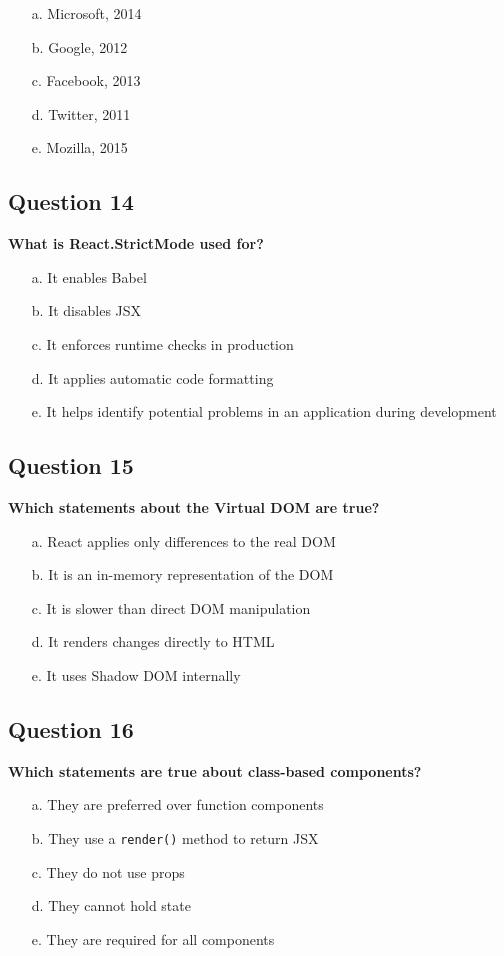 \documentclass{article}
\begin{document}
\begin{itemize}
  \item[a.] Microsoft, 2014
  \item[b.] Google, 2012
  \item[c.] Facebook, 2013
  \item[d.] Twitter, 2011
  \item[e.] Mozilla, 2015
\end{itemize}

\subsection*{Question 14}
\textbf{What is React.StrictMode used for?}

\begin{itemize}
  \item[a.] It enables Babel
  \item[b.] It disables JSX
  \item[c.] It enforces runtime checks in production
  \item[d.] It applies automatic code formatting
  \item[e.] It helps identify potential problems in an application during development
\end{itemize}

\subsection*{Question 15}
\textbf{Which statements about the Virtual DOM are true?}

\begin{itemize}
  \item[a.] React applies only differences to the real DOM
  \item[b.] It is an in-memory representation of the DOM
  \item[c.] It is slower than direct DOM manipulation
  \item[d.] It renders changes directly to HTML
  \item[e.] It uses Shadow DOM internally
\end{itemize}

\subsection*{Question 16}
\textbf{Which statements are true about class-based components?}

\begin{itemize}
  \item[a.] They are preferred over function components
  \item[b.] They use a \texttt{render()} method to return JSX
  \item[c.] They do not use props
  \item[d.] They cannot hold state
  \item[e.] They are required for all components
\end{itemize}
\end{document}
